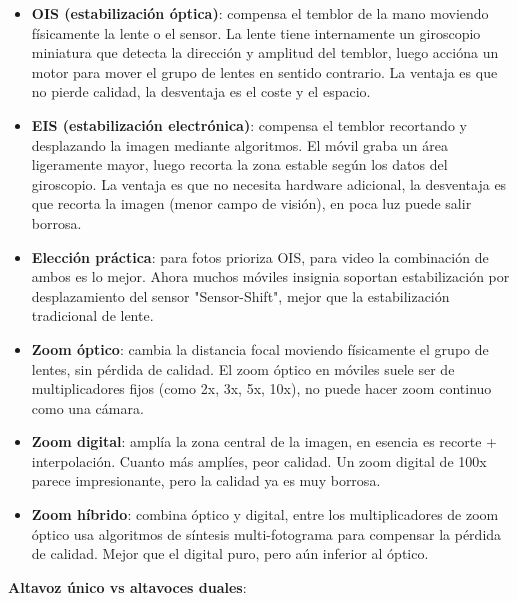 \begin{itemize}
  \item \textbf{OIS (estabilización óptica)}: compensa el temblor de la mano moviendo físicamente la lente o el sensor. La lente tiene internamente un giroscopio miniatura que detecta la dirección y amplitud del temblor, luego accióna un motor para mover el grupo de lentes en sentido contrario. La ventaja es que no pierde calidad, la desventaja es el coste y el espacio.
  \item \textbf{EIS (estabilización electrónica)}: compensa el temblor recortando y desplazando la imagen mediante algoritmos. El móvil graba un área ligeramente mayor, luego recorta la zona estable según los datos del giroscopio. La ventaja es que no necesita hardware adicional, la desventaja es que recorta la imagen (menor campo de visión), en poca luz puede salir borrosa.
  \item \textbf{Elección práctica}: para fotos prioriza OIS, para video la combinación de ambos es lo mejor. Ahora muchos móviles insignia soportan estabilización por desplazamiento del sensor "Sensor-Shift", mejor que la estabilización tradicional de lente.
\end{itemize}


\begin{itemize}
  \item \textbf{Zoom óptico}: cambia la distancia focal moviendo físicamente el grupo de lentes, sin pérdida de calidad. El zoom óptico en móviles suele ser de multiplicadores fijos (como 2x, 3x, 5x, 10x), no puede hacer zoom continuo como una cámara.
  \item \textbf{Zoom digital}: amplía la zona central de la imagen, en esencia es recorte + interpolación. Cuanto más amplíes, peor calidad. Un zoom digital de 100x parece impresionante, pero la calidad ya es muy borrosa.
  \item \textbf{Zoom híbrido}: combina óptico y digital, entre los multiplicadores de zoom óptico usa algoritmos de síntesis multi-fotograma para compensar la pérdida de calidad. Mejor que el digital puro, pero aún inferior al óptico.
\end{itemize}


\textbf{Altavoz único vs altavoces duales}:

